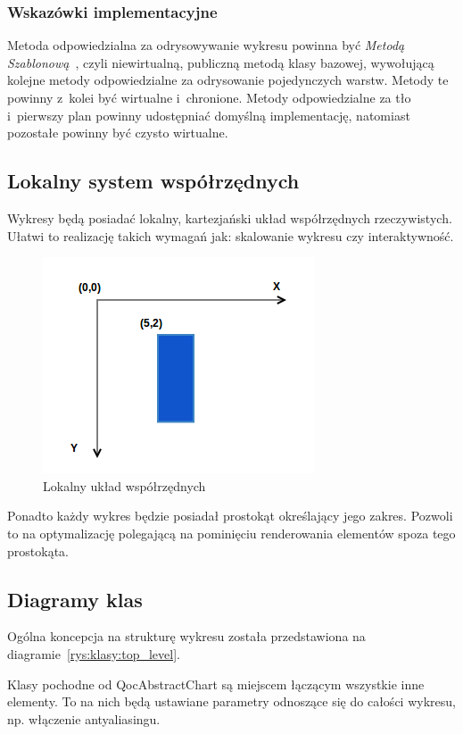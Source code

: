 \subsubsection{Wskazówki implementacyjne}
Metoda odpowiedzialna za odrysowywanie wykresu powinna być \textit{Metodą Szablonową}~\cite[264-268]{Patterns}, czyli niewirtualną, publiczną metodą klasy bazowej, wywołującą kolejne metody odpowiedzialne za odrysowanie pojedynczych warstw. Metody te powinny z~kolei być wirtualne i~chronione.
Metody odpowiedzialne za tło i~pierwszy plan powinny udostępniać domyślną implementację, natomiast pozostałe powinny być czysto wirtualne.

\subsection{Lokalny system współrzędnych}
Wykresy będą posiadać lokalny, kartezjański układ współrzędnych rzeczywistych. Ułatwi to realizację takich wymagań jak: skalowanie wykresu czy interaktywność. 

\begin{figure}
\centering
\caption{Lokalny układ współrzędnych}\label{rys:uklad:wspolrzednych}
\includegraphics{img/uklad_wspolrzednych.png}
\end{figure}

Ponadto każdy wykres będzie posiadał prostokąt określający jego zakres. Pozwoli to na optymalizację polegającą na pominięciu renderowania elementów spoza tego prostokąta.

\subsection{Diagramy klas}
Ogólna koncepcja na strukturę wykresu została przedstawiona na diagramie~\ref{rys:klasy:top_level}.

Klasy pochodne od QocAbstractChart są miejscem łączącym wszystkie inne elementy. To na nich będą ustawiane parametry odnoszące się do całości wykresu, np. włączenie antyaliasingu.

